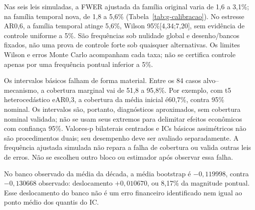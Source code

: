 Nas seis leis simuladas, a FWER ajustada da família original varia
de 1,6 a 3,1\%; na família temporal nova,
de 1,8 a 5,6\% (Tabela~\ref{tab:g-calibracao}).
No estresse AR0,6, a família temporal atinge 5,6\%,
Wilson 95\%[4,34;7,20], sem evidência de controle uniforme a 5\%.
São frequências sob nulidade global e desenho/bancos fixados, não
uma prova de controle forte sob quaisquer alternativas. Os limites
Wilson e erros Monte Carlo acompanham cada taxa; não se certifica
controle apenas por uma frequência pontual inferior a 5\%.

Os intervalos básicos falham de forma material. Entre os 84 casos
alvo--mecanismo, a cobertura marginal vai de 51,8
a 95,8\%. Por exemplo, com t5 heterocedástico eAR0,3,
a cobertura da média inicial é60,7\%, contra 95\% nominal.
Os intervalos são, portanto, diagnósticos aproximados, sem cobertura
nominal validada; não se usam seus extremos para delimitar efeitos
econômicos com confiança 95\%. Valores-p bilaterais centrados e ICs
básicos assimétricos não são procedimentos duais; seu desempenho
deve ser avaliado separadamente. A frequência ajustada simulada não
repara a falha de cobertura ou valida outras leis de erros.
Não se escolheu outro bloco ou estimador após observar essa falha.

No banco observado da média da década, a média bootstrap é $-0,119998$,
contra $-0,130668$ observado: deslocamento $+0,010670$, ou 8,17\%
da magnitude pontual. Esse deslocamento do banco não é um erro
financeiro identificado nem igual ao ponto médio dos quantis do IC.
